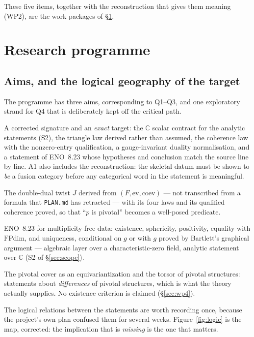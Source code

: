 \documentclass[11pt,a4paper]{article}
\theoremstyle{remark}
\newcommand{\FPdim}{\mathrm{FPdim}}
\newcommand{\Cx}{\mathbb{C}}
\begin{document}
These five items, together with the reconstruction that gives them meaning (WP2), are the work
packages of \S\ref{sec:programme}.
\section{Research programme}\label{sec:programme}

\subsection{Aims, and the logical geography of the target}

The programme has three aims, corresponding to Q1--Q3, and one exploratory strand for Q4 that
is deliberately kept off the critical path.

\begin{description}[leftmargin=2.2em,style=nextline]
\item[A1 (Signature and scope).] A corrected signature and an \emph{exact} target: the $\Cx$
scalar contract for the analytic statements (S2), the
triangle law derived rather than assumed, the coherence law with the nonzero-entry
qualification, a gauge-invariant duality normalisation, and a statement of ENO~8.23 whose
hypotheses and conclusion match the source line by line. A1 also includes the reconstruction:
the skeletal datum must be shown to \emph{be} a fusion category before any categorical word in
the statement is meaningful.
\item[A2 (Twist).] The double-dual twist $J$ derived from $(F, \mathrm{ev}, \mathrm{coev})$
--- not transcribed from a formula that \texttt{PLAN.md} has retracted --- with its four laws
and its qualified coherence proved, so that ``$p$ is pivotal'' becomes a well-posed predicate.
\item[A3 (Theorem).] ENO~8.23 for multiplicity-free data: existence, sphericity, positivity,
equality with $\FPdim$, and uniqueness, conditional on $g$ or with $g$ proved by Bartlett's
graphical argument --- algebraic layer over a characteristic-zero field, analytic statement
over $\Cx$ (S2 of \S\ref{sec:scope}).
\item[A4 (Frontier, exploratory).] The pivotal cover as an equivariantization and the torsor of
pivotal structures: statements about \emph{differences} of pivotal structures, which is what the
theory actually supplies. No existence criterion is claimed (\S\ref{sec:wp4}).
\end{description}

The logical relations between the statements are worth recording once, because the project's
own plan confused them for several weeks. Figure~\ref{fig:logic} is the map, corrected: the
implication that is \emph{missing} is the one that matters.
\end{document}
